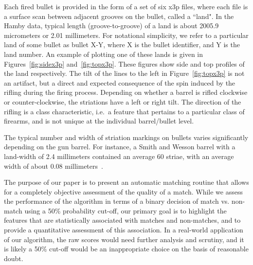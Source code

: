 \documentclass[aoas, preprint]{imsart}\usepackage[]{graphicx}\usepackage[]{color}
\begin{document}
Each fired bullet is provided in the form of a set of six x3p files, where each file is a surface scan between adjacent grooves on the bullet, called a ``land". In the Hamby data, typical length (groove-to-groove) of a land is about 2005.9 micrometers or 2.01 millimeters. For notational simplicity, we refer to a particular land of some bullet as bullet X-Y, where X is the bullet identifier, and Y is the land number. An example of plotting one of these lands is given in Figures~\ref{fig:sidex3p} and~\ref{fig:topx3p}. These figures show side and top profiles of the land respectively. The tilt of the lines to the left in Figure~\ref{fig:topx3p} is not an artifact, but a direct and expected consequence of the spin induced by the rifling during the firing process. Depending on whether a barrel is rifled clockwise or counter-clockwise, the striations have a left or right tilt. The direction of the rifling is a class characteristic, i.e.\ a feature that pertains to a particular class of firearms, and is not unique at the individual barrel/bullet level.

The typical number and width of striation markings on bullets varies significantly depending on the gun barrel. For instance, a Smith and Wesson barrel with a land-width of 2.4 millimeters contained an average 60 striae, with an average width of about 0.08 millimeters~\citep{chu:2011}.

The purpose of our paper is to present an automatic matching routine that allows for a completely objective assessment of the quality of a match. While we assess the performance of the algorithm in terms of a binary decision of match vs. non-match using a 50\% probability cut-off, our primary goal is to highlight the features that are statistically associated with matches and non-matches, and to provide a quantitative assessment of this association. In a real-world application of our algorithm, the raw scores would need further analysis and scrutiny, and it is likely a 50\% cut-off would be an inappropriate choice on the basis of reasonable doubt.
\end{document}

